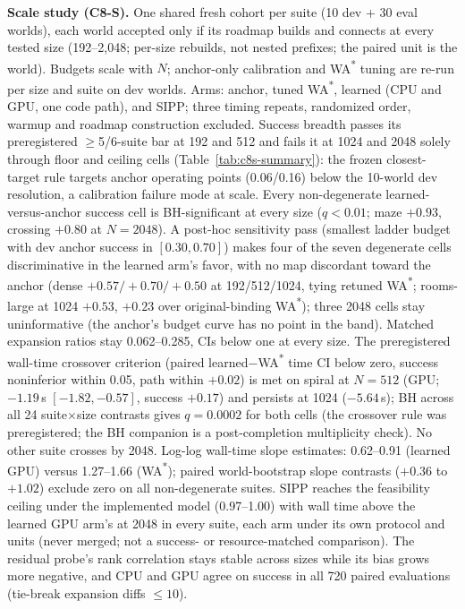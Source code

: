 \documentclass[letterpaper]{article} %
\begin{document}
\textbf{Scale study (C8-S).} One shared fresh cohort per suite (10 dev +
30 eval worlds), each world accepted only if its roadmap builds and connects at every tested size (192--2{,}048; per-size rebuilds,
not nested prefixes; the paired unit is the world). Budgets scale with $N$; anchor-only calibration and WA\textsuperscript{*} tuning are re-run per size and suite on dev worlds. Arms: anchor, tuned WA\textsuperscript{*}, learned (CPU and GPU, one code path), and SIPP; three timing repeats, randomized order, warmup and roadmap construction excluded. Success breadth passes its preregistered $\geq$5/6-suite bar at 192 and 512 and fails it at 1024 and
2048 solely through floor and ceiling cells (Table~\ref{tab:c8s-summary}): the frozen closest-target
rule targets anchor operating points (0.06/0.16) below the 10-world dev
resolution, a calibration failure mode at scale. Every non-degenerate learned-versus-anchor success cell is BH-significant at every size ($q<0.01$; maze $+0.93$, crossing $+0.80$ at $N{=}2048$). A post-hoc sensitivity pass (smallest ladder budget with dev anchor success in $[0.30, 0.70]$) makes four of the seven degenerate cells discriminative in the learned arm's favor, with no map discordant toward the anchor (dense $+0.57/+0.70/+0.50$ at
192/512/1024, tying retuned WA\textsuperscript{*}; rooms-large at 1024 $+0.53$, $+0.23$ over original-binding WA\textsuperscript{*});
three 2048 cells stay uninformative (the anchor's budget curve has no point in the band). Matched expansion ratios stay 0.062--0.285, CIs below one at every size. The preregistered wall-time crossover criterion (paired
learned$-$WA\textsuperscript{*} time CI below zero, success noninferior
within 0.05, path within $+0.02$) is met on spiral at $N{=}512$ (GPU;
$-1.19$\,s $[-1.82,-0.57]$, success $+0.17$) and persists at 1024
($-5.64$\,s); BH across all 24 suite$\times$size contrasts gives
$q{=}0.0002$ for both cells (the crossover rule was preregistered; the BH companion is a post-completion multiplicity check). No other suite crosses by 2048. Log-log wall-time slope estimates: 0.62--0.91 (learned GPU) versus 1.27--1.66
(WA\textsuperscript{*}); paired world-bootstrap slope contrasts ($+0.36$ to $+1.02$) exclude zero on all non-degenerate suites. SIPP reaches the feasibility ceiling under the implemented model
(0.97--1.00) with wall time above the learned GPU arm's at 2048 in every suite, each arm under its own protocol and units (never merged; not a success- or resource-matched comparison). The residual probe's rank correlation stays stable across sizes while its bias grows more negative, and CPU and GPU agree on success in all 720 paired evaluations (tie-break expansion
diffs $\leq 10$).
\end{document}
